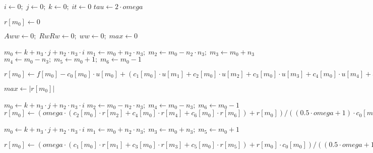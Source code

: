 \documentclass{article}
\begin{document}
 
 
\begin{algorithm}
\caption{mptm(IN: $c_1, c_2, c_3, c_4, c_5, c_6, c_0, f, omega, e;$ OUT: $u$)}\label{alg:mptm}
\begin{algorithmic}[1]
 
\State $i \gets 0;\; j \gets 0;\; k \gets 0;\; it \gets 0$
\State $tau \gets 2 \cdot omega$

\State $r[m_0] \gets 0$
\EndFor

\Repeat
\State $Aww \gets 0;\; RwRw \gets 0;\; ww \gets 0;\; max \gets 0$

\State $m_0 \gets k + n_3 \cdot j + n_2 \cdot n_3 \cdot i$
\State $m_1 \gets m_0 + n_2 \cdot n_3;\; m_2 \gets m_0 - n_2 \cdot n_3;\; m_3 \gets m_0 + n_3$
\State $m_4 \gets m_0 - n_3;\; m_5 \gets m_0 + 1;\; m_6 \gets m_0 - 1$
\State \parbox[t]{\dimexpr\linewidth-\algorithmicindent-\algorithmicindent-\algorithmicindent-\algorithmicindent-\algorithmicindent}{$r[m_0] \gets f[m_0] - c_0[m_0] \cdot u[m_0] + (c_1[m_0] \cdot u[m_1] + c_2[m_0] \cdot u[m_2] + c_3[m_0] \cdot u[m_3] + c_4[m_0] \cdot u[m_4] + c_5[m_0] \cdot u[m_5] + c_6[m_0] \cdot u[m_6])$}
\State $max \gets |r[m_0]|$
\EndIf
\EndIf
\EndFor
\EndFor
\EndFor

\State $m_0 \gets k + n_3 \cdot j + n_2 \cdot n_3 \cdot i$
\State $m_2 \gets m_0 - n_2 \cdot n_3;\; m_4 \gets m_0 - n_3;\; m_6 \gets m_0 - 1$
\State $r[m_0] \gets (omega \cdot (c_2[m_0] \cdot r[m_2] + c_4[m_0] \cdot r[m_4] + c_6[m_0] \cdot r[m_6]) + r[m_0]) / ((0.5 \cdot omega + 1) \cdot c_0[m_0]) $
\EndIf
\EndFor
\EndFor
\EndFor

\State $m_0 \gets k + n_3 \cdot j + n_2 \cdot n_3 \cdot i$
\State $m_1 \gets m_0 + n_2 \cdot n_3;\; m_3 \gets m_0 + n_3;\; m_5 \gets m_0 + 1$
\State \parbox[t]{\dimexpr\linewidth-\algorithmicindent-\algorithmicindent-\algorithmicindent-\algorithmicindent-\algorithmicindent}{$r[m_0] \gets (omega \cdot (c_1[m_0] \cdot r[m_1] + c_3[m_0] \cdot r[m_3] + c_5[m_0] \cdot r[m_5]) + r[m_0] \cdot c_0[m_0]) / ((0.5 \cdot omega + 1) \cdot c_0[m_0]) $}
\EndIf
\EndFor
\EndFor
\EndFor


\end{algorithmic}
\end{algorithm}
\end{document}
